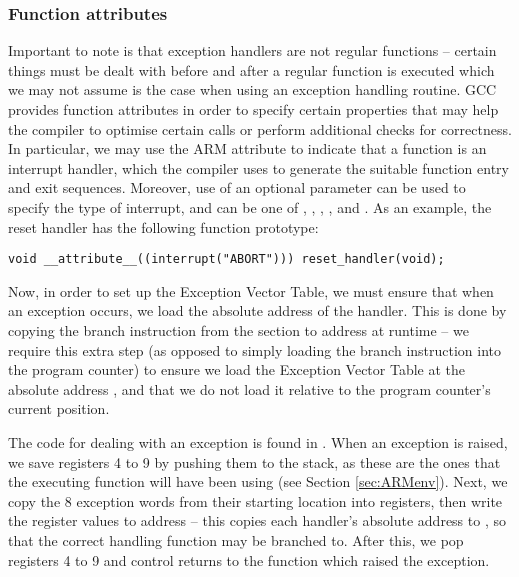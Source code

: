     \subsubsection{Function attributes}
        Important to note is that exception handlers are not regular functions
        -- certain things must be dealt with before and after a regular function
        is executed which we may not assume is the case when using an exception
        handling routine. GCC provides function attributes in order to specify
        certain properties that may help the compiler to optimise certain calls
        or perform additional checks for correctness. In particular, we may use
        the ARM  attribute to indicate that a function is an
        interrupt handler, which the compiler uses to generate the suitable
        function entry and exit sequences. Moreover, use of an optional
        parameter can be used to specify the type of interrupt, and can be one
        of , , , , and 
        \cite{ARM_FnAttribs}.  As an example, the reset handler has the
        following function prototype:
        
        \lstset{language=c}
        \begin{lstlisting}[caption={Reset handler prototype},captionpos=b]
void __attribute__((interrupt("ABORT"))) reset_handler(void);
        \end{lstlisting}

        Now, in order to set up the Exception Vector Table, we must ensure that
        when an exception occurs, we load the absolute address of the handler.
        This is done by copying the branch instruction from the 
        section to address  at runtime -- we require this extra step
        (as opposed to simply loading the branch instruction into the program
        counter) to ensure we load the Exception Vector Table at the absolute
        address , and that we do not load it relative to the program
        counter's current position.

        The code for dealing with an exception is found in
        . When an exception is raised, we save registers 4
        to 9 by pushing them to the stack, as these are the ones that the
        executing function will have been using (see Section \ref{sec:ARMenv}).
        Next, we copy the 8 exception words from their starting location into
        registers, then write the register values to address  -- this
        copies each handler's absolute address to , so that the
        correct handling function may be branched to. After this, we pop
        registers 4 to 9 and control returns to the function which raised the
        exception.

